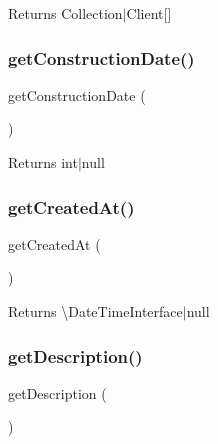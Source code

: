 \begin{DoxyReturn}{Returns}
Collection$\vert$\+Client\mbox{[}\mbox{]} 
\end{DoxyReturn}
\mbox{\label{class_app_1_1_entity_1_1_possession_a3a079c2281624581ab697a07c885c23a}} 
\subsubsection{\texorpdfstring{getConstructionDate()}{getConstructionDate()}}
{\footnotesize\ttfamily get\+Construction\+Date (\begin{DoxyParamCaption}{ }\end{DoxyParamCaption})}

\begin{DoxyReturn}{Returns}
int$\vert$null 
\end{DoxyReturn}
\mbox{\label{class_app_1_1_entity_1_1_possession_a0f0455d4aafe27d1b0720c3bcfff2847}} 
\subsubsection{\texorpdfstring{getCreatedAt()}{getCreatedAt()}}
{\footnotesize\ttfamily get\+Created\+At (\begin{DoxyParamCaption}{ }\end{DoxyParamCaption})}

\begin{DoxyReturn}{Returns}
\textbackslash{}\+Date\+Time\+Interface$\vert$null 
\end{DoxyReturn}
\mbox{\label{class_app_1_1_entity_1_1_possession_a2e7bb35c71bf1824456ceb944cb7a845}} 
\subsubsection{\texorpdfstring{getDescription()}{getDescription()}}
{\footnotesize\ttfamily get\+Description (\begin{DoxyParamCaption}{ }\end{DoxyParamCaption})}

